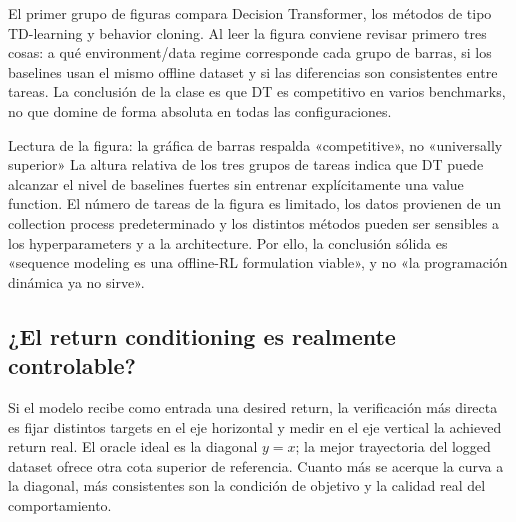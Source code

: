 El primer grupo de figuras compara Decision Transformer, los métodos de tipo TD-learning y behavior cloning. Al leer la figura conviene revisar primero tres cosas: a qué environment/data regime corresponde cada grupo de barras, si los baselines usan el mismo offline dataset y si las diferencias son consistentes entre tareas. La conclusión de la clase es que DT es competitivo en varios benchmarks, no que domine de forma absoluta en todas las configuraciones.


\begin{knowledgebox}{Lectura de la figura: la gráfica de barras respalda «competitive», no «universally superior»}
La altura relativa de los tres grupos de tareas indica que DT puede alcanzar el nivel de baselines fuertes sin entrenar explícitamente una value function. El número de tareas de la figura es limitado, los datos provienen de un collection process predeterminado y los distintos métodos pueden ser sensibles a los hyperparameters y a la architecture. Por ello, la conclusión sólida es «sequence modeling es una offline-RL formulation viable», y no «la programación dinámica ya no sirve».
\end{knowledgebox}


\subsection{¿El return conditioning es realmente controlable?}

Si el modelo recibe como entrada una desired return, la verificación más directa es fijar distintos targets en el eje horizontal y medir en el eje vertical la achieved return real. El oracle ideal es la diagonal $y=x$; la mejor trayectoria del logged dataset ofrece otra cota superior de referencia. Cuanto más se acerque la curva a la diagonal, más consistentes son la condición de objetivo y la calidad real del comportamiento.

